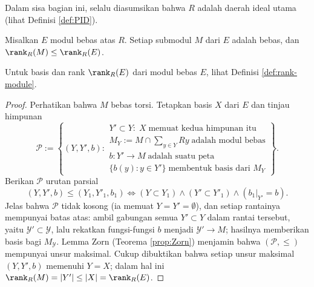 \begin{convention}
	Dalam sisa bagian ini, selalu diasumsikan bahwa $R$ adalah daerah ideal utama (lihat Definisi \ref{def:PID}).
\end{convention}

\begin{lemma}\label{prop:PID-free-submodule}
	Misalkan $E$ modul bebas atas $R$. Setiap submodul $M$ dari $E$ adalah bebas, dan $\rank_R(M) \leq \rank_R(E)$. 
\end{lemma}
Untuk basis dan rank $\rank_R(E)$ dari modul bebas $E$, lihat Definisi \ref{def:rank-module}.
\begin{proof}
	Perhatikan bahwa $M$ bebas torsi. Tetapkan basis $X$ dari $E$ dan tinjau himpunan
	\[ \mathcal{P} := \left\{ (Y,Y',b) :
		\begin{array}{l}
			Y' \subset Y: \; X \; \text{memuat kedua himpunan itu} \\
			M_Y := M \cap \sum_{y \in Y} Ry \; \text{adalah modul bebas} \\
			b: Y' \to M \; \text{adalah suatu peta} \\
			\{b(y) : y \in Y'\} \;\text{membentuk basis dari $M_Y$}
		\end{array}
	\right\}. \]
	Berikan $\mathcal{P}$ urutan parsial
	\[ (Y, Y', b) \leq (Y_1, Y'_1, b_1) \iff (Y \subset Y_1) \wedge (Y' \subset Y'_1) \wedge (b_1|_{Y'} = b). \]
	Jelas bahwa $\mathcal{P}$ tidak kosong (ia memuat $Y=Y'=\emptyset$), dan setiap rantainya mempunyai batas atas: ambil gabungan semua $Y' \subset Y$ dalam rantai tersebut, yaitu $\mathcal{Y}' \subset \mathcal{Y}$, lalu rekatkan fungsi-fungsi $b$ menjadi $\mathcal{Y}' \to M$; hasilnya memberikan basis bagi $M_{\mathcal{Y}}$. Lemma Zorn (Teorema \ref{prop:Zorn}) menjamin bahwa $(\mathcal{P}, \leq)$ mempunyai unsur maksimal. Cukup dibuktikan bahwa setiap unsur maksimal $(Y,Y',b)$ memenuhi $Y=X$; dalam hal ini $\rank_R(M) = |Y'| \leq |X| = \rank_R(E)$.


\end{proof}
